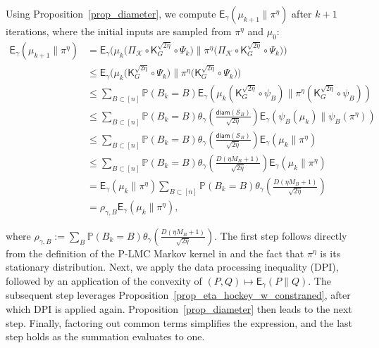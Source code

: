 \documentclass[10pt, journal]{IEEEtran}
\makeatletter
\def\eqref#1{equation~\ref{#1}}
\renewcommand{\eqref}[1]{\textup{\tagform@{\ref{#1}}}}
\makeatother
\begin{document}
Using Proposition~\ref{prop_diameter}, we compute \(\mathsf{E}_\gamma(\mu_{k+1} \| \pi^\eta)\) after \(k+1\) iterations, where the initial inputs are sampled from \(\pi^\eta\) and \(\mu_0\):
\begin{align}
    \mathsf{E}_\gamma(\mu_{k+1} \| \pi^\eta)
    &=\mathsf{E}_\gamma\Big(\mu_k\big(\Pi_\mathcal{K} \circ \mathsf{K}_G^{\sqrt{2\eta}} \circ \Psi_k \big)  \big\| \pi^\eta \big(\Pi_\mathcal{K} \circ \mathsf{K}_G^{\sqrt{2\eta}} \circ \Psi_k \big)\Big) \nonumber\\
    &\le \mathsf{E}_\gamma\Big(\mu_k\big(\mathsf{K}_G^{\sqrt{2\eta}} \circ \Psi_k \big)  \big\| \pi^\eta\big(\mathsf{K}_G^{\sqrt{2\eta}} \circ \Psi_k \big)\Big) \nonumber\\
    &\le \sum_{B \subset \left[n\right]} \mathbb{P}(B_k = B)   \mathsf{E}_\gamma \left(\mu_k(\mathsf{K}_G^{\sqrt{2\eta}} \circ \psi_B ) \big\| \pi^\eta(\mathsf{K}_G^{\sqrt{2\eta}} \circ \psi_B)  \right) \nonumber\\
    &\le \sum_{B \subset [n]} \mathbb{P}(B_k = B)  \theta_{\gamma}\left(\frac{\mathsf{diam}(\mathcal{S}_B)}{\sqrt{2\eta}}\right) \mathsf{E}_\gamma\left(\psi_B(\mu_k)\big\| \psi_B(\pi^\eta)\right) \nonumber\\
    &\le \sum_{B \subset [n]} \mathbb{P}(B_k = B)  \theta_{\gamma}\left(\frac{\mathsf{diam}(\mathcal{S}_B)}{\sqrt{2\eta}}\right) \mathsf{E}_\gamma\left(\mu_k\| \pi^\eta\right) \label{eq_modify_for_convex}\\
    &\le \sum_{B \subset [n]} \mathbb{P}(B_k = B)  \theta_{\gamma}\left(\frac{D(\eta M_B + 1)}{\sqrt{2\eta}}\right)  \mathsf{E}_\gamma\left(\mu_k\| \pi^\eta\right) \nonumber\\
    &= \mathsf{E}_\gamma\left(\mu_k\| \pi^\eta\right) \sum_{B \subset [n]} \mathbb{P}(B_k = B)\theta_{\gamma}\left(\frac{D(\eta M_B + 1)}{\sqrt{2\eta}}\right)\nonumber\\
    &= \rho_{\gamma,B}\mathsf{E}_\gamma \left(\mu_k\|\pi^\eta\right)\nonumber ,
\end{align}


where $\rho_{\gamma,B} := \sum_{B} \mathbb{P}(B_k = B) \theta_{\gamma}\left(\frac{D(\eta M_B + 1)}{\sqrt{2\eta}}\right)$. 
The first step follows directly from the definition of the P-LMC Markov kernel in \eqref{Kernel_representation} and the fact that $\pi^\eta$ is its stationary distribution. Next, we apply the data processing inequality (DPI), followed by an application of the convexity of $(P, Q) \mapsto \mathsf{E}_\gamma(P \| Q)$. The subsequent step leverages Proposition~\ref{prop_eta_hockey_w_constraned}, after which DPI is applied again. Proposition~\ref{prop_diameter} then leads to the next step. Finally, factoring out common terms simplifies the expression, and the last step holds as the summation evaluates to one.
\end{document}
